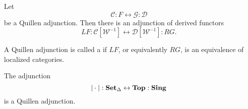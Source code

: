 \documentclass[main.tex]{subfiles}
\begin{document}
\begin{proposition}
  \label{prop:derived_functors_form_adjunction}
  Let
  \begin{equation*}
    \mathcal{C} : F \leftrightarrow \mathcal{G} : \mathcal{D}
  \end{equation*}
  be a Quillen adjunction. Then there is an adjunction of derived functors
  \begin{equation*}
    LF : \mathcal{C}[\mathcal{W}^{-1}] \leftrightarrow \mathcal{D}[\mathcal{W}^{-1}] : RG.
  \end{equation*}
\end{proposition}

\begin{definition}
  \label{def:quillen_equivalence}
  A Quillen adjunction is called a  if $LF$, or equivalently $RG$, is an equivalence of localized categories.
\end{definition}

\begin{theorem}
  The adjunction
  \begin{equation*}
    {| \cdot |} : \operatorname{\mathbf{Set}_{\Delta}} \leftrightarrow \mathbf{Top} : \mathbf{Sing}
  \end{equation*}
  is a Quillen adjunction.
\end{theorem}
\end{document}
